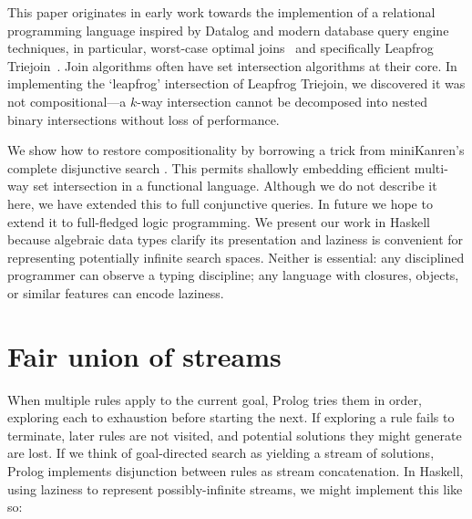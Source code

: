 \documentclass[acmsmall,screen,dvipsnames,svgnames]{acmart}
\newcommand\todo[1]{{\color{Orange}#1}}
\renewcommand\todo[1]{{\color{IndianRed}#1}}
\newcommand\XXX{\todo{XXX}}
\renewcommand\todo[1]{\ignorespaces}
\begin{document}
This paper originates in early work towards the implemention of a relational programming language inspired by Datalog and modern database query engine techniques, in particular, worst-case optimal joins~\citep{DBLP:conf/pods/NgoPRR12} and specifically Leapfrog Triejoin~\citep{lftj}.
%
Join algorithms often have set intersection algorithms at their core.
In implementing the `leapfrog' intersection of Leapfrog Triejoin, we discovered it was not compositional---a $k$-way intersection cannot be decomposed into nested binary intersections without loss of performance.

We show how to restore compositionality by borrowing a trick from miniKanren's complete disjunctive search%
.
%
This permits shallowly embedding efficient multi-way set intersection in a functional language.
Although we do not describe it here, we have extended this to full conjunctive queries.
In future we hope to extend it to full-fledged logic programming.
%
We present our work in Haskell because algebraic data types clarify its presentation and laziness is convenient for representing potentially infinite search spaces.
Neither is essential: any disciplined programmer can observe a typing discipline; any language with closures, objects, or similar features can encode laziness.



\section{Fair union of streams}

When multiple rules apply to the current goal, Prolog tries them in order, exploring each to exhaustion before starting the next.
If exploring a rule fails to terminate, later rules are not visited, and potential solutions they might generate are lost.
If we think of goal-directed search as yielding a stream of solutions, Prolog implements disjunction between rules as stream concatenation.
In Haskell, using laziness to represent possibly-infinite streams, we might implement this like so:
\end{document}
